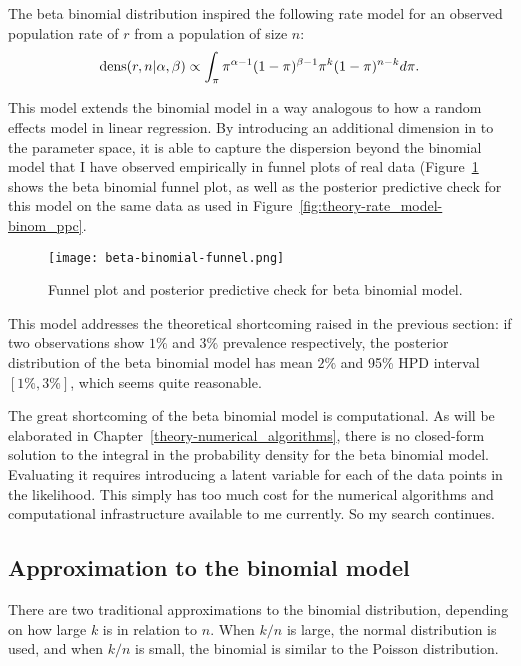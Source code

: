 The beta binomial distribution inspired the following rate model for
an observed population rate of $r$ from a population of size $n$:
\[
\operatorname{dens}(r,n|\alpha, \beta) \propto \int_{\pi}
\pi^{\alpha-1}(1-\pi)^{\beta-1} \pi^k (1-\pi)^{n-k}
d\pi.
\]

This model extends the binomial model in a way analogous to how a
random effects model in linear regression.  By introducing an
additional dimension in to the parameter space, it is able to capture
the dispersion beyond the binomial model that I have observed
empirically in funnel plots of real data
(Figure~\ref{fig:theory-rate_beta-binomial-funnel} shows the beta
binomial funnel plot, as well as the posterior predictive check for
this model on the same data as used in
Figure~\ref{fig:theory-rate_model-binom_ppc}.

\begin{figure}[ht]
\begin{center}
\texttt{[image: beta-binomial-funnel.png]}
\end{center}
\caption{Funnel plot and posterior predictive check for beta binomial model.}
\label{fig:theory-rate_beta-binomial-funnel}
\end{figure}

This model addresses the theoretical shortcoming raised in the
previous section: if two observations show $1\%$ and $3\%$ prevalence
respectively, the posterior distribution of the beta binomial model
has mean $2\%$ and 95\% HPD interval $[1\%,3\%]$, which seems quite
reasonable.

The great shortcoming of the beta binomial model is computational.  As
will be elaborated in Chapter~\ref{theory-numerical_algorithms}, there
is no closed-form solution to the integral in the probability density
for the beta binomial model.  Evaluating it requires introducing a
latent variable for each of the data points in the likelihood.  This
simply has too much cost for the numerical algorithms and
computational infrastructure available to me currently.  So my search
continues.

\subsection{Approximation to the binomial model}
There are two traditional approximations to the binomial distribution,
depending on how large $k$ is in relation to $n$.  When $k/n$ is
large, the normal distribution is used, and when $k/n$ is small, the
binomial is similar to the Poisson distribution.

